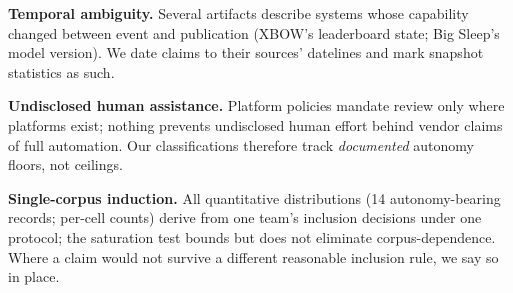 \textbf{Temporal ambiguity.} Several artifacts describe systems whose capability changed
between event and publication (XBOW's leaderboard state; Big Sleep's model version). We date
claims to their sources' datelines and mark snapshot statistics as such.

\textbf{Undisclosed human assistance.} Platform policies mandate review only where platforms
exist; nothing prevents undisclosed human effort behind vendor claims of full automation. Our
classifications therefore track \emph{documented} autonomy floors, not ceilings.

\textbf{Single-corpus induction.} All quantitative distributions (14 autonomy-bearing records;
per-cell counts) derive from one team's inclusion decisions under one protocol; the saturation
test bounds but does not eliminate corpus-dependence. Where a claim would not survive a
different reasonable inclusion rule, we say so in place.
